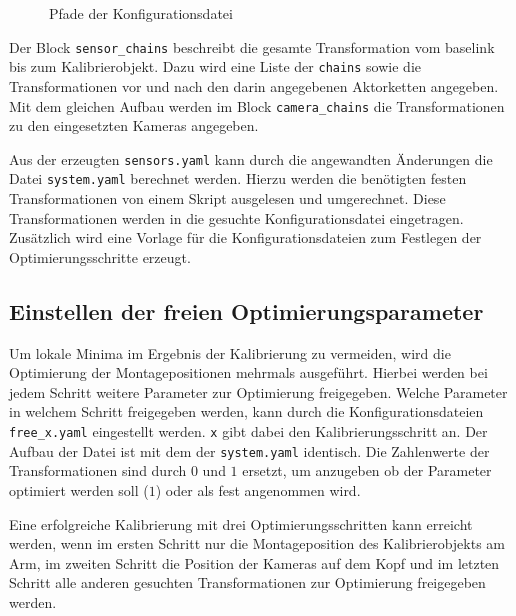 \begin{figure}[htpb]
  \centering
  \def\svgwidth{.5\textwidth}
  
  \caption{Pfade der Konfigurationsdatei}
  \label{fig:ketten}
\end{figure}

Der Block \texttt{sensor\_chains} beschreibt die gesamte Transformation vom \ac{baselink}
bis zum Kalibrierobjekt. Dazu wird eine Liste der \texttt{chains} sowie die
Transformationen vor und nach den darin angegebenen Aktorketten angegeben.
Mit dem gleichen Aufbau werden im Block \texttt{camera\_chains} die Transformationen zu den 
eingesetzten Kameras angegeben.

Aus der erzeugten \texttt{sensors.yaml} kann durch die angewandten Änderungen
die Datei \texttt{system.yaml} berechnet werden. Hierzu werden die benötigten
festen Transformationen von einem Skript ausgelesen und umgerechnet. Diese
Transformationen werden in die gesuchte Konfigurationsdatei eingetragen.
Zusätzlich wird eine Vorlage für die Konfigurationsdateien zum Festlegen
der Optimierungsschritte erzeugt.

\subsection{Einstellen der freien Optimierungsparameter}
\label{sub:Einstellen der freien Optimierungsparameter}

Um lokale Minima im Ergebnis der Kalibrierung zu vermeiden, wird die Optimierung
der Montagepositionen mehrmals ausgeführt. Hierbei werden bei jedem Schritt 
weitere Parameter zur Optimierung freigegeben. Welche Parameter in welchem 
Schritt freigegeben werden, kann durch die Konfigurationsdateien
\texttt{free\_x.yaml} eingestellt werden. \texttt{x} gibt dabei den Kalibrierungsschritt an.
Der Aufbau der Datei ist mit dem der \texttt{system.yaml} identisch. Die
Zahlenwerte der Transformationen sind durch $0$ und $1$ ersetzt, um anzugeben ob
der Parameter optimiert werden soll ($1$) oder als fest angenommen wird.

Eine erfolgreiche Kalibrierung mit drei Optimierungsschritten kann erreicht 
werden, wenn im ersten Schritt nur die Montageposition des Kalibrierobjekts 
am Arm, im zweiten Schritt die Position der Kameras auf dem Kopf und im letzten 
Schritt alle anderen gesuchten Transformationen zur Optimierung freigegeben 
werden.


